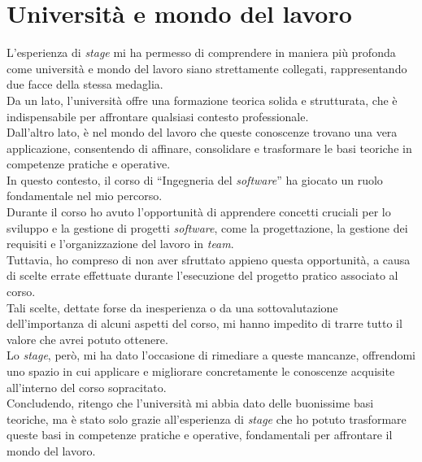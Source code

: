 \section{Università e mondo del lavoro}
\label{sez:universita-mondo-lavoro}

L’esperienza di \textit{stage} mi ha permesso di comprendere in maniera più profonda come università e mondo del lavoro siano strettamente collegati, rappresentando due facce della stessa medaglia.\\
Da un lato, l’università offre una formazione teorica solida e strutturata, che è indispensabile per affrontare qualsiasi contesto professionale. \\
Dall’altro lato, è nel mondo del lavoro che queste conoscenze trovano una vera applicazione, consentendo di affinare, consolidare e trasformare le basi teoriche in competenze pratiche e operative.  \\

\noindent In questo contesto, il corso di ``Ingegneria del \textit{software}'' ha giocato un ruolo fondamentale nel mio percorso.\\
Durante il corso ho avuto l’opportunità di apprendere concetti cruciali per lo sviluppo e la gestione di progetti \textit{software}, come la progettazione, la gestione dei requisiti e l’organizzazione del lavoro in \textit{team}. \\
Tuttavia, ho compreso di non aver sfruttato appieno questa opportunità, a causa di scelte errate effettuate durante l’esecuzione del progetto pratico associato al corso.\\
Tali scelte, dettate forse da inesperienza o da una sottovalutazione dell’importanza di alcuni aspetti del corso, mi hanno impedito di trarre tutto il valore che avrei potuto ottenere. \\ 

\noindent Lo \textit{stage}, però, mi ha dato l’occasione di rimediare a queste mancanze, offrendomi uno spazio in cui applicare e migliorare concretamente le conoscenze acquisite all'interno del corso sopracitato.\\

\noindent Concludendo, ritengo che l'università mi abbia dato delle buonissime basi teoriche, ma è stato solo grazie all'esperienza di \textit{stage} che ho potuto trasformare queste basi in competenze pratiche e operative, fondamentali per affrontare il mondo del lavoro.\\